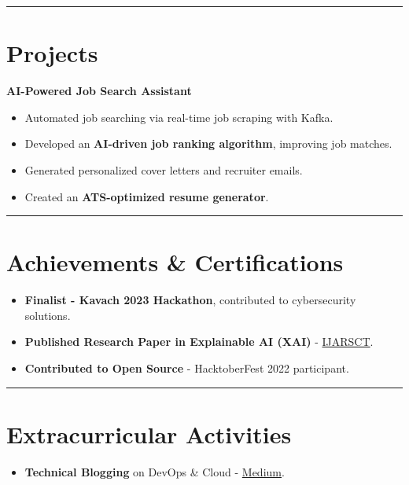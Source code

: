 \documentclass[a4paper,10pt]{article}
\begin{document}
\hrule
\section*{Projects}
\textbf{AI-Powered Job Search Assistant}
\begin{itemize}
    \item Automated job searching via real-time job scraping with Kafka.
    \item Developed an \textbf{AI-driven job ranking algorithm}, improving job matches.
    \item Generated personalized cover letters and recruiter emails.
    \item Created an \textbf{ATS-optimized resume generator}.
\end{itemize}

\vspace{3 pt}

\hrule
\vspace{3pt}

\section*{Achievements \& Certifications}
\begin{itemize}
    \item \textbf{Finalist - Kavach 2023 Hackathon}, contributed to cybersecurity solutions.
    \item \textbf{Published Research Paper in Explainable AI (XAI)} - \href{https://ijarsct.co.in/Paper18344.pdf}{IJARSCT}.
    \item \textbf{Contributed to Open Source} - HacktoberFest 2022 participant.
\end{itemize}

\hrule
\vspace{3pt}

\section*{Extracurricular Activities}
\begin{itemize}
    \item \textbf{Technical Blogging} on DevOps \& Cloud - \href{https://medium.com/@yash.7232.rajput}{Medium}.
\end{itemize}
\end{document}
